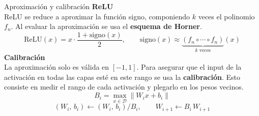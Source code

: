 \begin{frame}{Aproximación y calibración}
    \setlength{\abovedisplayskip}{5pt}\setlength{\belowdisplayskip}{5pt}
    \setlength{\abovedisplayshortskip}{5pt}\setlength{\belowdisplayshortskip}{5pt}
    \textbf{ReLU}
    \vspace{0.1cm}
    \\ ReLU se reduce a aproximar la función signo, componiendo $k$ veces el polinomio $f_n$. Al evaluar la aproximación se usa el \textbf{esquema de Horner}.
    \[
        \mathrm{ReLU}(x) = x \cdot \frac{1 + \mathrm{signo}(x)}{2},
        \qquad
        \mathrm{signo}(x) \approx \underbrace{(f_n \circ \cdots \circ f_n)}_{k \text{ veces}}(x)
    \]
    \textbf{Calibración}
    \vspace{0.1cm}
    \\ La aproximación solo es válida en $[-1,1]$. Para asegurar que el input de la activación en todas las capas esté en este rango se usa la \textbf{calibración}. Esto consiste en medir el rango de cada activación y plegarlo en los pesos vecinos.
    \[
        B_i = \max_{x \in \mathcal{D}} \lVert W_i x + b_i \rVert
    \]
    \[
        (W_i,\, b_i) \leftarrow (W_i,\, b_i) / B_i,
        \qquad
        W_{i+1} \leftarrow B_i \, W_{i+1}
    \]
\end{frame}

